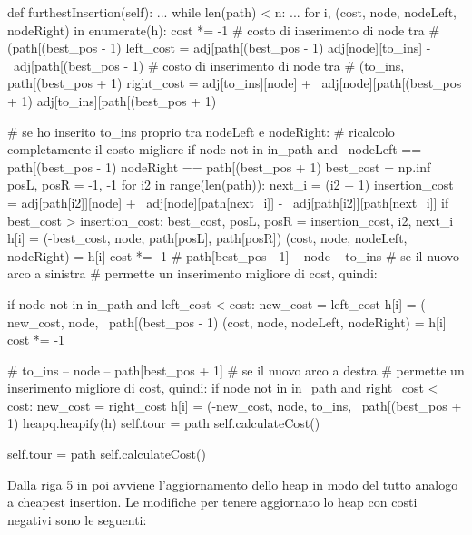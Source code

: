 \documentclass[a4paper,12pt]{report}
\begin{document}
\begin{python}
def furthestInsertion(self):
  ...
  while len(path) < n:
    ...
    for i, (cost, node, nodeLeft, nodeRight) in enumerate(h):
      cost *= -1
      # costo di inserimento di node tra 
      # (path[(best_pos - 1) %
      left_cost = adj[path[(best_pos - 1) %
                  adj[node][to_ins] - \
                  adj[path[(best_pos - 1) %
      # costo di inserimento di node tra 
      # (to_ins, path[(best_pos + 1) %
      right_cost = adj[to_ins][node] + \
                   adj[node][path[(best_pos + 1) %
                   adj[to_ins][path[(best_pos + 1) %

      # se ho inserito to_ins proprio tra nodeLeft e nodeRight:
      # ricalcolo completamente il costo migliore
      if node not in in_path and \
         nodeLeft == path[(best_pos - 1) %
         nodeRight == path[(best_pos + 1) %
        best_cost = np.inf
        posL, posR = -1, -1
        for i2 in range(len(path)):
          next_i = (i2 + 1) %
          insertion_cost = adj[path[i2]][node] + \
                           adj[node][path[next_i]] - \
                           adj[path[i2]][path[next_i]]
          if best_cost > insertion_cost:
            best_cost, posL, posR = insertion_cost, i2, next_i
        h[i] = (-best_cost, node, path[posL], path[posR])
        (cost, node, nodeLeft, nodeRight) = h[i]
        cost *= -1
      # path[best_pos - 1] -- node -- to_ins
      # se il nuovo arco a sinistra 
      # permette un inserimento migliore di cost, quindi:
                  
      if node not in in_path and left_cost < cost:
        new_cost = left_cost
        h[i] = (-new_cost, node, \
                path[(best_pos - 1) %
        (cost, node, nodeLeft, nodeRight) = h[i]
        cost *= -1

      # to_ins -- node -- path[best_pos + 1] 
      # se il nuovo arco a destra
      # permette un inserimento migliore di cost, quindi:
      if node not in in_path and right_cost < cost:
        new_cost = right_cost
        h[i] = (-new_cost, node, to_ins, \
                path[(best_pos + 1) %
    heapq.heapify(h)
  self.tour = path
  self.calculateCost()

self.tour = path
self.calculateCost()
\end{python}
Dalla riga 5 in poi avviene l'aggiornamento dello heap in modo del tutto analogo a cheapest insertion. Le modifiche per tenere aggiornato lo heap con costi negativi sono le seguenti:
\end{document}
